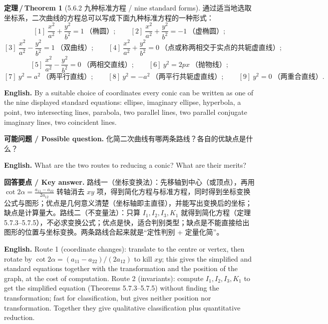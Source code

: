 \documentclass[UTF8,11pt,a4paper]{ctexart}
\newcommand{\EN}[1]{\par\noindent \textbf{English.} #1\par}
\newcommand{\ASK}[4]{\par\noindent \textbf{可能问题 / Possible question.} #1\par\EN{#2}\noindent \textbf{回答要点 / Key answer.} #3\par\EN{#4}\medskip}
\theoremstyle{definition}
\newtheorem*{theorem}{定理\,/\,Theorem}
\begin{document}
\begin{theorem}[5.6.2 九种标准方程 / nine standard forms]\label{thm:nine}
通过适当地选取坐标系，二次曲线的方程总可以写成下面九种标准方程的一种形式：
\[
{[1]}\ \frac{x^2}{a^2}+\frac{y^2}{b^2}=1\ \text{（椭圆）};\qquad
{[2]}\ \frac{x^2}{a^2}+\frac{y^2}{b^2}=-1\ \text{（虚椭圆）};
\]
\[
{[3]}\ \frac{x^2}{a^2}-\frac{y^2}{b^2}=1\ \text{（双曲线）};\qquad
[4]\ \frac{x^2}{a^2}+\frac{y^2}{b^2}=0\ \text{（点或称两相交于实点的共轭虚直线）};
\]
\[
{[5]}\ \frac{x^2}{a^2}-\frac{y^2}{b^2}=0\ \text{（两相交直线）};\qquad
[6]\ y^2=2px\ \text{（抛物线）};
\]
\[
{[7]}\ y^2=a^2\ \text{（两平行直线）};\qquad
[8]\ y^2=-a^2\ \text{（两平行共轭虚直线）};\qquad
[9]\ y^2=0\ \text{（两重合直线）}.
\]
\EN{By a suitable choice of coordinates every conic can be written as one of the nine displayed standard equations: ellipse, imaginary ellipse, hyperbola, a point, two intersecting lines, parabola, two parallel lines, two parallel conjugate imaginary lines, two coincident lines.}
\end{theorem}

\ASK{化简二次曲线有哪两条路线？各自的优缺点是什么？}{What are the two routes to reducing a conic? What are their merits?}{路线一（坐标变换法）：先移轴到中心（或顶点），再用 $\cot2\alpha=\frac{a_{11}-a_{22}}{2a_{12}}$ 转轴消去 $xy$ 项，得到简化方程与标准方程，同时得到坐标变换公式与图形；优点是几何意义清楚（坐标轴即主直径），并能写出变换后的坐标；缺点是计算量大。路线二（不变量法）：只算 $I_1,I_2,I_3,K_1$ 就得到简化方程（定理 5.7.3--5.7.5），不必求变换公式；优点是快，适合判别类型；缺点是不能直接给出图形的位置与坐标变换。两条路线合起来就是``定性判别 + 定量化简''。}{Route 1 (coordinate changes): translate to the centre or vertex, then rotate by $\cot2\alpha=(a_{11}-a_{22})/(2a_{12})$ to kill $xy$; this gives the simplified and standard equations together with the transformation and the position of the graph, at the cost of computation. Route 2 (invariants): compute $I_1,I_2,I_3,K_1$ to get the simplified equation (Theorems 5.7.3--5.7.5) without finding the transformation; fast for classification, but gives neither position nor transformation. Together they give qualitative classification plus quantitative reduction.}
\end{document}
